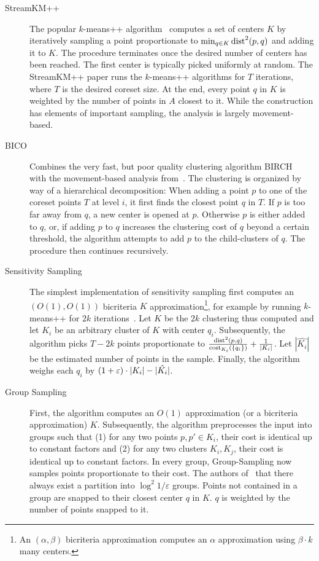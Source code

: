 \begin{description}
\item[StreamKM++~\cite{AckermannMRSLS12}] The popular $k$-means++ algorithm~\cite{ArV07} computes a set of centers $K$ by iteratively sampling a point  proportionate to $\min_{q\in K} \text{dist}^2(p,q)$ and adding it to $K$. The procedure terminates once the desired number of centers has been reached. The first center is typically picked uniformly at random.
The StreamKM++ paper runs the $k$-means++ algorithms for $T$ iterations, where $T$ is the desired coreset size. At the end, every point $q$ in $K$ is weighted by the number of points in $A$ closest to it. While the construction has elements of important sampling, the analysis is largely movement-based.
\item[BICO~\cite{FGSSS13}] Combines the very fast, but poor quality clustering algorithm BIRCH~\cite{ZRL97} with the movement-based analysis from~\cite{FrahlS2005,HaM04}. The clustering is organized by way of a hierarchical decomposition: When adding a point $p$ to one of the coreset points $T$ at level $i$, it first finds the closest point $q$ in $T$.  If $p$ is too far away from $q$, a new center is opened at $p$. Otherwise $p$ is either added to $q$, or, if adding $p$ to $q$ increases the clustering cost of $q$ beyond a certain threshold, the algorithm attempts to add $p$ to the child-clusters of $q$. The procedure then continues recursively. 
\item[Sensitivity Sampling~\cite{FL11}] The simplest implementation of sensitivity sampling first computes an $(O(1),O(1))$ bicriteria $K$ approximation\footnote{An $(\alpha,\beta)$ bicriteria approximation computes an $\alpha$ approximation using $\beta\cdot k$ many centers.}, for example by running $k$-means++ for $2k$ iterations~\cite{Wei16}. Let $K$ be the $2k$ clustering thus computed and let $K_i$ be an arbitrary cluster of $K$ with center $q_i$. Subsequently, the algorithm picks $T-2k$ points proportionate to $\frac{\text{dist}^2(p,q)}{\text{cost}_{K_i}(\{q_i\})} + \frac{1}{|K_i|}$. Let $|\hat{K_i}|$ be the estimated number of points in the sample. Finally, the algorithm weighs each $q_i$ by $(1+\varepsilon)\cdot |K_i| - |\hat{K_i}|$.
\item[Group Sampling~\cite{Cohen-AddadSS21}] First, the algorithm computes an $O(1)$ approximation (or a bicriteria approximation) $K$. Subsequently, the algorithm preprocesses the input into groups such that (1) for any two points $p,p'\in K_i$, their cost is identical up to constant factors and (2) for any two clusters $K_i,K_j$, their cost is identical up to constant factors. In every group, Group-Sampling now samples points proportionate to their cost. The authors of~\cite{Cohen-AddadSS21}  that there always exist a partition  into $\log^2 1/\varepsilon$ groups. Points not contained in a group are snapped to their closest center $q$ in $K$. $q$ is weighted by the number of points snapped to it.
\end{description}

